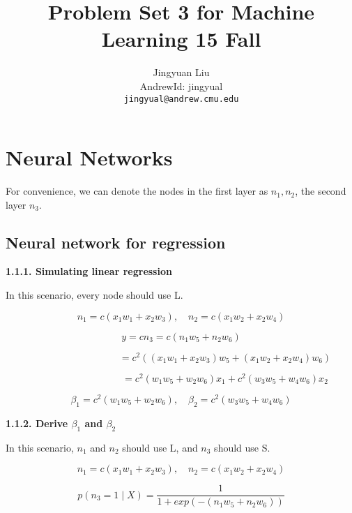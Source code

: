 \documentclass{article} %
\title{Problem Set 3 for Machine Learning 15 Fall}
\author{
Jingyuan Liu\\
AndrewId: jingyual\\
\texttt{jingyual@andrew.cmu.edu} \\
}
\begin{document}
\maketitle



\section{Neural Networks}


For convenience, we can denote the nodes in the first layer as $n_1, n_2$, the
second layer $n_3$.

\subsection{Neural network for regression}
\textbf{1.1.1. Simulating linear regression}

In this scenario, every node should use L.

\begin{equation}
n_1 = c(x_1 w_1 + x_2 w_3), \quad
n_2 = c(x_1 w_2 + x_2 w_4)
\end{equation}

\begin{equation}
y = c n_3 =  c(n_1 w_5 + n_2 w_6)
\end{equation}

\begin{equation}
\qquad \qquad \qquad \qquad \quad
= c^2 ((x_1 w_1 + x_2 w_3) w_5 + (x_1 w_2 + x_2 w_4) w_6)
\end{equation}

\begin{equation}
\qquad \qquad \qquad \qquad \quad
= c^2 (w_1 w_5 + w_2 w_6) x_1 + c^2 (w_3 w_5 + w_4 w_6) x_2
\end{equation}

\begin{equation}
\beta_1 = c^2 (w_1 w_5 + w_2 w_6),  \quad
\beta_2 = c^2 (w_3 w_5 + w_4 w_6)
\end{equation}

\textbf{1.1.2. Derive $\beta_1$ and $\beta_2$}

In this scenario, $n_1$ and $n_2$ should use L, and $n_3$ should use S.

\begin{equation}
n_1 = c(x_1 w_1 + x_2 w_3), \quad
n_2 = c(x_1 w_2 + x_2 w_4)
\end{equation}

\begin{equation}
p(n_3 = 1 \mid X) = \frac{1}{1 + exp(-(n_1 w_5 + n_2 w_6))}
\end{equation}
\end{document}
